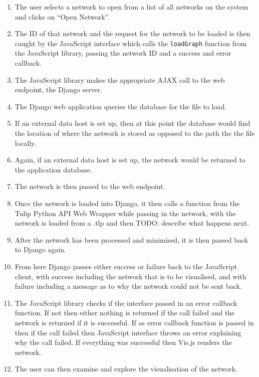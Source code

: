 \documentclass[../dissertation.tex]{subfiles}
\begin{document}
\begin{enumerate}
    \item The user selects a network to open from a list of all networks on the system and clicks on ``Open Network''.
    \item The ID of that network and the request for the network to be loaded is then caught by the JavaScript interface which calls the \texttt{loadGraph} function from the JavaScript library, passing the network ID and a success and error callback.
    \item The JavaScript library makes the appropriate AJAX call to the web endpoint, the Django server.
    \item The Django web application queries the database for the file to load.
    \item If an external data host is set up, then at this point the database would find the location of where the network is stored as opposed to the path the the file locally.
    \item Again, if an external data host is set up, the network would be returned to the application database.
    \item The network is then passed to the web endpoint.
    \item Once the network is loaded into Django, it then calls a function from the Tulip Python API Web Wrapper while passing in the network, with the network is loaded from a .tlp and then TODO: describe what happens next.
    \item After the network has been processed and minimised, it is then passed back to Django again.
    \item From here Django passes either success or failure back to the JavaScript client, with success including the network that is to be visualised, and with failure including a message as to why the network could not be sent back.
    \item The JavaScript library checks if the interface passed in an error callback function. If not then either nothing is returned if the call failed and the network is returned if it is successful. If as error callback function is passed in then if the call failed then JavaScript interface throws an error explaining why the call failed. If everything was successful then Vis.js renders the network.
    \item The user can then examine and explore the visualisation of the network.
\end{enumerate}
\end{document}
